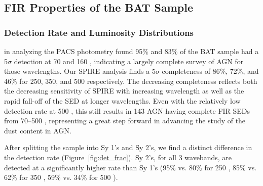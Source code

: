 \subsection{FIR Properties of the BAT Sample }
\subsubsection{Detection Rate and Luminosity Distributions}
\citet{Melendez:2014yu} in analyzing the PACS photometry found 95\% and 83\% of the BAT sample had a 5$\sigma$ detection at 70 and 160 \um, indicating a largely complete survey of AGN for those wavelengths. Our SPIRE analysis finds a 5$\sigma$ completeness of 86\%, 72\%, and 46\% for 250, 350, and 500 \um{} respectively. The decreasing completeness reflects both the decreasing sensitivity of SPIRE with increasing wavelength as well as the rapid fall-off of the SED at longer wavelengths. Even with the relatively low detection rate at 500 \um, this still results in 143 AGN having complete FIR SEDs from 70--500 \um, representing a great step forward in advancing the study of the dust content in AGN. 

After splitting the sample into Sy 1's and Sy 2's, we find a distinct difference in the detection rate (Figure~\ref{fig:det_frac}). Sy 2's, for all 3 wavebands, are detected at a significantly higher rate than Sy 1's (95\% vs. 80\% for 250 \um, 85\% vs. 62\% for 350 \um, 59\% vs. 34\% for 500 \um).
  
  
  